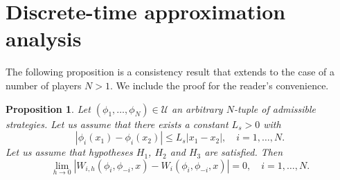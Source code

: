 \documentclass[12pt]{article}
\newtheorem{proposition}{Proposition}
\begin{document}
\section{Discrete-time approximation analysis}

The following proposition is a consistency result that extends \cite[Chapter 6, Lemma 1.2]{Bardi} to the case of a number of players $N>1$. We include the proof for the reader's convenience.
\begin{proposition}\label{consistency}
Let  $(\phi_1,\dots,\phi_N)\in\mathcal{U}$ an arbitrary $N$-tuple of admissible strategies. Let us assume that there exists a constant $L_s>0$ with
\begin{equation}\label{lipschitz_strategies}
|\phi_i(x_1)-\phi_i(x_2)|\le L_s |x_1-x_2|,\quad i=1,\dots, N.
\end{equation}
Let us assume that hypotheses $H_1$, $H_2$ and $H_3$ are satisfied.
 Then
\begin{equation*}
\lim_{h\rightarrow 0} \left|W_{i,h}(\phi_{i},\phi_{-i},x)- W_i(\phi_{i},\phi_{-i},x)\right|=0,
\quad i=1,\dots,N.
\end{equation*}
\end{proposition}
\end{document}
